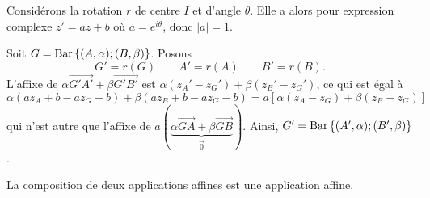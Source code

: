             \begin{ex}
                  Consid\'erons la rotation $r$ de centre $I$ et d'angle $\theta$.
                  Elle a alors pour expression complexe $z' = az + b$ o\`u $a = e^{i\theta}$, donc $|a| = 1$.
                  
                  Soit $G = \mathrm{Bar}\left\lbrace (A,\alpha);(B,\beta) \right\rbrace$. 
                  Posons
                        $$
                        G' = r(G)
                              \qquad
                        A' = r(A)
                              \qquad
                        B' = r(B).
                        $$
                  L'affixe de $\alpha \overrightarrow{G'A'} + \beta \overrightarrow{G'B'}$ 
                  est $\alpha (z_A' - z_G') + \beta (z_B' - z_G')$,
                  ce qui est \'egal \`a 
                  \[
                        \alpha (a z_A + b - a z_G - b) + \beta (a z_B + b - a z_G - b) =
                                                      a \left[ \alpha (z_A - z_G) + \beta (z_B - z_G) \right] \]
                  qui n'est autre que l'affixe de 
                  $a ( \underbrace{\alpha \overrightarrow{GA} + \beta \overrightarrow{GB}}_{\vec{0}} )$.
                  Ainsi, $G'= \mathrm{Bar}\left\lbrace (A',\alpha);(B',\beta) \right\rbrace$.
            \end{ex}
%
      \begin{thm}
            La composition de deux applications affines est une application affine.
            \newline {}
      \end{thm}
%
